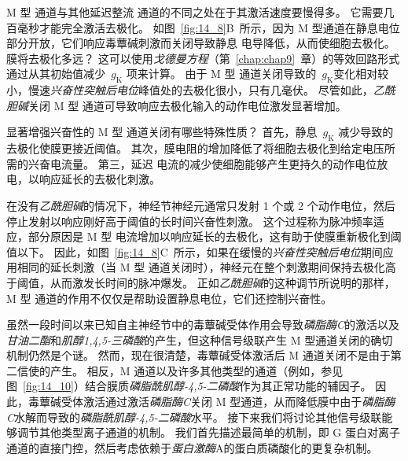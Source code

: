 M 型  通道与其他延迟整流  通道的不同之处在于其激活速度要慢得多。
它需要几百毫秒才能完全激活去极化。
如图~\ref{fig:14_8}B~所示，因为 M 型通道在静息电位部分开放，它们响应毒蕈碱刺激而关闭导致静息  电导降低，从而使细胞去极化。
膜将去极化多远？
这可以使用\textit{戈德曼方程}（第~\ref{chap:chap9}~章）的等效回路形式通过从其初始值减少~$g_\text{K}$ 项来计算。
由于 M 型  通道关闭导致的~$g_\text{K}$变化相对较小，慢速\textit{兴奋性突触后电位}峰值处的去极化很小，只有几毫伏。
尽管如此，\textit{乙酰胆碱}关闭 M 型  通道可导致响应去极化输入的动作电位激发显著增加。


显著增强兴奋性的 M 型  通道关闭有哪些特殊性质？
首先，静息~$g_\text{K}$ 减少导致的去极化使膜更接近阈值。
其次，膜电阻的增加降低了将细胞去极化到给定电压所需的兴奋电流量。
第三，延迟  电流的减少使细胞能够产生更持久的动作电位放电，以响应延长的去极化刺激。


在没有\textit{乙酰胆碱}的情况下，神经节神经元通常只发射 1 个或 2 个动作电位，然后停止发射以响应刚好高于阈值的长时间兴奋性刺激。
这个过程称为脉冲频率适应，部分原因是 M 型  电流增加以响应延长的去极化，这有助于使膜重新极化到阈值以下。
因此，如图~\ref{fig:14_8}C~所示，如果在缓慢的\textit{兴奋性突触后电位}期间应用相同的延长刺激（当 M 型  通道关闭时），神经元在整个刺激期间保持去极化高于阈值，从而激发长时间的脉冲爆发。
正如\textit{乙酰胆碱}的这种调节所说明的那样，M 型  通道的作用不仅仅是帮助设置静息电位，它们还控制兴奋性。


虽然一段时间以来已知自主神经节中的毒蕈碱受体作用会导致\textit{磷脂酶C}的激活以及\textit{甘油二酯}和\textit{肌醇1,4,5-三磷酸}的产生，但这种信号级联产生 M 型通道关闭的确切机制仍然是个谜。
然而，现在很清楚，毒蕈碱受体激活后 M 通道关闭不是由于第二信使的产生。
相反，M 通道以及许多其他类型的通道（例如，参见图~\ref{fig:14_10}）结合膜质\textit{磷脂酰肌醇-4,5-二磷酸}作为其正常功能的辅因子。
因此，毒蕈碱受体激活通过激活\textit{磷脂酶C}关闭 M 型通道，从而降低膜中由于\textit{磷脂酶C}水解而导致的\textit{磷脂酰肌醇-4,5-二磷酸}水平。
接下来我们将讨论其他信号级联能够调节其他类型离子通道的机制。
我们首先描述最简单的机制，即 G 蛋白对离子通道的直接门控，然后考虑依赖于\textit{蛋白激酶}A的蛋白质磷酸化的更复杂机制。


